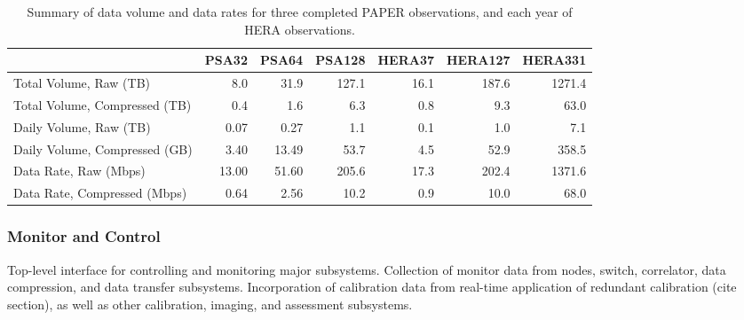 \documentclass[preprint]{aastex}
\begin{document}
%
%

\begin{table}
\begin{tabular}{| l | r r r r r r |}
    \hline
                                      & PSA32 & PSA64 & PSA128 & HERA37 & HERA127 & HERA331 \\ \hline
               Total Volume, Raw (TB) &   8.0 &  31.9 &  127.1 &   16.1 &   187.6 &  1271.4 \\
        Total Volume, Compressed (TB) &   0.4 &   1.6 &    6.3 &    0.8 &     9.3 &    63.0 \\
               Daily Volume, Raw (TB) &  0.07 &  0.27 &    1.1 &    0.1 &     1.0 &     7.1 \\
        Daily Volume, Compressed (GB) &  3.40 & 13.49 &   53.7 &    4.5 &    52.9 &   358.5 \\
                Data Rate, Raw (Mbps) & 13.00 & 51.60 &  205.6 &   17.3 &   202.4 &  1371.6 \\
         Data Rate, Compressed (Mbps) &  0.64 &  2.56 &   10.2 &    0.9 &    10.0 &    68.0 \\
    \hline
\end{tabular}
\caption{\small
\label{tab:data_vol} Summary of data volume and data rates for three completed PAPER observations, and each year of HERA observations.}
\end{table}

\subsubsection{Monitor and Control}


Top-level interface for controlling and monitoring major subsystems. 
Collection of monitor data from nodes, switch, correlator, data compression, and data transfer subsystems.
Incorporation of calibration data from real-time application of redundant calibration (cite section), as well as
other calibration, imaging, and assessment subsystems.

\end{document}
